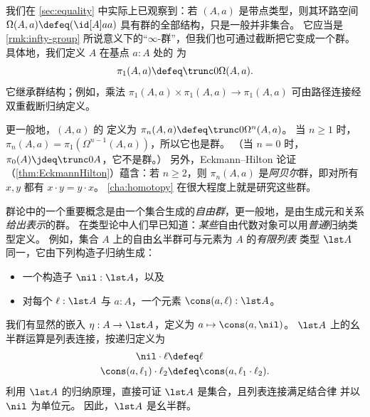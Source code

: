 \begin{eg}\label{thm:homotopy-groups}
  我们在 \cref{sec:equality} 中实际上已观察到：若 $(A,a)$ 是带点类型，则其环路空间 $\Omega(A,a)\defeq (\id[A]aa)$ 具有群的全部结构，只是一般并非集合。
  它应当是 \cref{rmk:infty-group} 所说意义下的“$\infty$-群”，但我们也可通过截断把它变成一个群。
  具体地，我们定义 $A$ 在基点 $a:A$ 处的
  为
  \[\pi_1(A,a)\defeq \trunc0{\Omega(A,a)}.\]
  它继承群结构；例如，乘法 $\pi_1(A,a) \times \pi_1(A,a) \to \pi_1(A,a)$ 可由路径连接经双重截断归纳定义。

  更一般地，$(A,a)$ 的
  定义为 $\pi_n(A,a)\defeq \trunc0{\Omega^n(A,a)}$。
  当 $n\ge 1$ 时，$\pi_n(A,a) = \pi_1(\Omega^{n-1}(A,a))$，所以它也是群。
  （当 $n=0$ 时，$\pi_0(A) \jdeq \trunc0 A$，它不是群。）
  另外，Eckmann--Hilton 论证 （\cref{thm:EckmannHilton}）蕴含：若 $n\ge 2$，则 $\pi_n(A,a)$ 是\emph{阿贝尔}群，即对所有 $x,y$ 都有 $x\cdot y = y\cdot x$。
  \cref{cha:homotopy} 在很大程度上就是研究这些群。
\end{eg}

%
%
群论中的一个重要概念是由一个集合生成的\emph{自由群}，更一般地，是由生成元和关系\emph{给出表示}的群。
在类型论中人们早已知道：\emph{某些}自由代数对象可以用\emph{普通}归纳类型定义。
%
%
%
%
例如，集合 $A$ 上的自由幺半群可与元素为 $A$ 的\emph{有限列表}  类型 $\lst A$ 同一，它由下列构造子归纳生成：
\begin{itemize}
\item 一个构造子 $\nil:\lst A$，以及
\item 对每个 $\ell:\lst A$ 与 $a:A$，一个元素 $\cons(a,\ell):\lst A$。
\end{itemize}
我们有显然的嵌入 $\eta : A\to \lst A$，定义为 $a\mapsto \cons(a,\nil)$。
$\lst A$ 上的幺半群运算是列表连接，按递归定义为
\begin{align*}
  \nil \cdot \ell &\defeq \ell\\
  \cons (a,\ell_1) \cdot \ell_2 &\defeq \cons(a, \ell_1\cdot\ell_2).
\end{align*}
利用 $\lst A$ 的归纳原理，直接可证 $\lst A$ 是集合，且列表连接满足结合律
%
并以 $\nil$ 为单位元。
因此，$\lst A$ 是幺半群。

